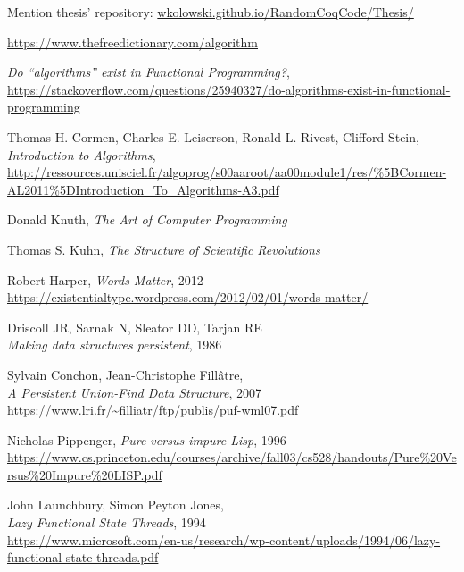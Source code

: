 \documentclass[declaration,mgr,english,shortabstract]{iithesis}
\begin{document}
Mention thesis' repository: \url{wkolowski.github.io/RandomCoqCode/Thesis/}


\begin{thebibliography}{1}

    \url{https://www.thefreedictionary.com/algorithm}

    \textit{Do ``algorithms'' exist in Functional Programming?}, \\
    \url{https://stackoverflow.com/questions/25940327/do-algorithms-exist-in-functional-programming}

    Thomas H. Cormen, Charles E. Leiserson, Ronald L. Rivest, Clifford Stein, \\
    \textit{Introduction to Algorithms}, \\
    \url{http://ressources.unisciel.fr/algoprog/s00aaroot/aa00module1/res/%5BCormen-AL2011%5DIntroduction_To_Algorithms-A3.pdf}

    Donald Knuth, \textit{The Art of Computer Programming}

    Thomas S. Kuhn, \textit{The Structure of Scientific Revolutions}

    Robert Harper, \textit{Words Matter}, 2012 \\
    \url{https://existentialtype.wordpress.com/2012/02/01/words-matter/}

    Driscoll JR, Sarnak N, Sleator DD, Tarjan RE \\
    \textit{Making data structures persistent}, 1986

    Sylvain Conchon, Jean-Christophe Fillâtre, \\
    \textit{A Persistent Union-Find Data Structure}, 2007 \\
    \url{https://www.lri.fr/~filliatr/ftp/publis/puf-wml07.pdf}

    Nicholas Pippenger, \textit{Pure versus impure Lisp}, 1996 \\
    \url{https://www.cs.princeton.edu/courses/archive/fall03/cs528/handouts/Pure%20Versus%20Impure%20LISP.pdf}

    John Launchbury, Simon Peyton Jones, \\
    \textit{Lazy Functional State Threads}, 1994 \\
    \url{https://www.microsoft.com/en-us/research/wp-content/uploads/1994/06/lazy-functional-state-threads.pdf}


\end{thebibliography}
\end{document}
